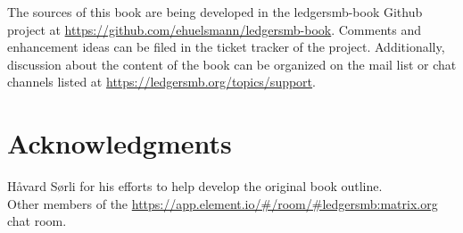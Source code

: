 \documentclass[10pt,a4paper]{book}
\begin{document}
The sources of this book are being developed in the ledgersmb-book Github project at
\url{https://github.com/ehuelsmann/ledgersmb-book}. Comments and enhancement ideas can be filed
in the ticket tracker of the project. Additionally, discussion about the content of the book
can be organized on the mail list or chat channels listed  at \url{https://ledgersmb.org/topics/support}.


\section*{Acknowledgments}
\label{sec-acknowledgements}

H{\aa}vard S{\o}rli for his efforts to help develop the original book outline.\\
Other members of the \url{https://app.element.io/#/room/#ledgersmb:matrix.org}  chat room.









\printindex
\end{document}
